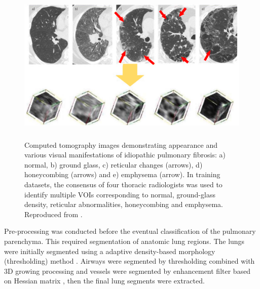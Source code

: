 \begin{figure}[htbp]
  \centering 
  \includegraphics[height=3.0in]{QuantitativeAnalysis/Image/CALIPERPatterns.png}
  \caption{Computed tomography images demonstrating appearance and various visual manifestations of idiopathic pulmonary fibrosis: a) normal, b) ground glass, c) reticular changes (arrows), d) honeycombing (arrows) and e) emphysema (arrow). In training datasets, the consensus of four thoracic radiologists was used to identify multiple VOIs corresponding to normal, ground-glass density, reticular abnormalities, honeycombing and emphysema. Reproduced from \citep{maldonado2013automated}.}
  \label{fig:CALIPERPatterns}
\end{figure}

Pre-processing was conducted before the eventual classification of the pulmonary parenchyma. This required segmentation of anatomic lung regions. The lungs were initially segmented using a adaptive density-based morphology (thresholding) method \citep{hu2001automatic}. Airways were segmented by thresholding combined with 3D growing processing and vessels were segmented by enhancement filter based on Hessian matrix \citep{sato2000tissue}, then the final lung segments were extracted. 

